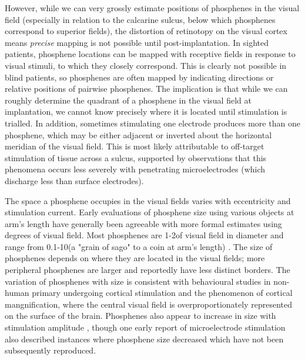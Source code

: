 \documentclass[a4paper,11pt,openany]{book}
\begin{document}
However, while we can very grossly estimate positions of phosphenes in the visual field (especially in relation to the calcarine sulcus, below which phosphenes correspond to superior fields), the distortion of retinotopy on the visual cortex means \emph{precise} mapping is not possible until post-implantation.
In sighted patients, phosphene locations can be mapped with receptive fields in response to visual stimuli, to which they closely correspond. \cite{bosking_saturation_2017,bosking_rules_2018,beauchamp_dynamic_2018}
This is clearly not possible in blind patients, so phosphenes are often mapped by indicating directions or relative positions of pairwise phosphenes. \cite{schmidt_feasibility_1996,beauchamp_dynamic_2018,brindley_sensations_1968,dobelle_mapping_1979}
The implication is that while we can roughly determine the quadrant of a phosphene in the visual field at implantation, we cannot know precisely where it is located until stimulation is trialled.
In addition, sometimes stimulating one electrode produces more than one phosphene, which may be either adjacent or inverted about the horizontal meridian of the visual field. \cite{brindley_sensations_1968,dobelle_phosphenes_1974,schmidt_feasibility_1996}
This is most likely attributable to off-target stimulation of tissue across a sulcus, supported by observations that this phenomena occurs less severely with penetrating microelectrodes (which discharge less than surface electrodes). \cite{dobelle_mapping_1979,schmidt_feasibility_1996}

The space a phosphene occupies in the visual fields varies with eccentricity and stimulation current.
Early evaluations of phosphene size using various objects at arm's length \cite{brindley_sensations_1968,dobelle_phosphenes_1974,dobelle_artificial_2000,dobelle_artificial_1974,schmidt_feasibility_1996} have generally been agreeable with more formal estimates using degrees of visual field. \cite{bak_visual_1990,bosking_saturation_2017,winawer_linking_2016}
Most phosphenes are 1-2\degree  of visual field in diameter and range from 0.1-10\degree  (a "grain of sago" to a coin at arm's length) . \cite{bak_visual_1990,bosking_saturation_2017,brindley_sensations_1968}
The size of phosphenes depends on where they are located in the visual fields; more peripheral phosphenes are larger and reportedly have less distinct borders. \cite{rushton_properties_1978,winawer_linking_2016,bosking_saturation_2017}
The variation of phosphenes with size is consistent with behavioural studies in non-human primary undergoing cortical stimulation \cite{tehovnik_phosphene_2007} and the phenomenon of cortical mangnification, where the central visual field is overproportionately represented on the surface of the brain. \cite{born_cortical_2015}
Phosphenes also appear to increase in size with stimulation amplitude \cite{rushton_properties_1978,winawer_linking_2016,bosking_saturation_2017}, though one early report of microelectrode stimulation also described instances where phosphene size decreased which have not been subsequently reproduced. \cite{schmidt_feasibility_1996}
\end{document}
